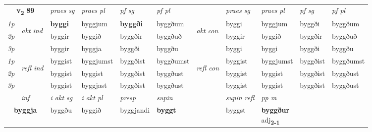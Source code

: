 \noindent
\begin{tabular}{lllllllllll} \toprule
\multicolumn{2}{c}{\textbf{v{\textsubscript{2}}} \Large{\textbf{89}}}  &  \textit{praes sg}  & \textit{praes pl}  &\textit{ pf sg} & \textit{pf pl} &  &  \textit{praes sg}  & \textit{praes pl}  & \textit{pf sg} & \textit{pf pl } \\*
	\cmidrule{3-6} \cmidrule{8-11}
 {\textit{1p}} & \multirow{3}{*}{\begin{turn}{90}\textit{akt ind}\end{turn}} & \textbf{byggi} & byggjum & \textbf{byggði} & byggðum & \multirow{3}{*}{\begin{turn}{90}\textit{akt con}\end{turn}} &byggi & byggjum & byggði & byggðum\\*
 {\textit{2p}} &  &  byggir  & byggið & byggðir & byggðuð & & byggir & byggið & byggðir & byggðuð \\*
{\textit{3p}} &  & byggir & byggja & byggði & byggðu & & byggi & byggi& byggði & byggðu \\*
\cmidrule{3-6} \cmidrule{8-11}
 {\textit{1p}} & \multirow{3}{*}{\begin{turn}{90}\textit{refl ind}\end{turn}}  & byggist & byggjumst & byggðist & byggðumst & \multirow{3}{*}{\begin{turn}{90}\textit{refl con}\end{turn}}  &byggist & byggjumst & byggðist & byggðumst \\*
 {\textit{2p}} &  & byggist & byggist & byggðist & byggðust & &byggist & byggist & byggðist & byggðust \\*
 {\textit{3p}}  & & byggist & byggjast & byggðist & byggðust & & byggist & byggist& byggðist & byggðust \\*
\cmidrule{3-6} \cmidrule{8-11}

   \multicolumn{2}{c}{\textit{inf}}  & \textit{i akt sg} & \textit{i akt pl}   & \textit{presp} & \textit{supin} && \textit{supin refl} & \textit{pp m} \\*
  \multicolumn{2}{c}{\textbf{byggja}} & byggðu  & byggið   & byggjandi &  \textbf{byggt} && byggst & \specialcell{\textbf{byggður} \\ adj\textbf{\textsubscript{2-1}}} \\*
\end{tabular}

